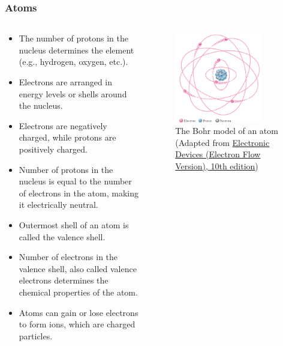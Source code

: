 \begin{frame}
	\frametitle{Atoms}
	\begin{columns}
		\begin{column}{0.65\textwidth}
          \begin{itemize}
            \item The number of protons in the nucleus determines the element (e.g., hydrogen, oxygen, etc.).
            \item Electrons are arranged in energy levels or shells around the nucleus.
            \item Electrons are negatively charged, while protons are positively charged.
            \item Number of protons in the nucleus is equal to the number of electrons in the atom, making it electrically neutral.
            \item Outermost shell of an atom is called the valence shell.
            \item Number of electrons in the valence shell, also called valence electrons determines the chemical properties of the atom.
            \item Atoms can gain or lose electrons to form ions, which are charged particles.
          \end{itemize}
		\end{column}
        \hfill
		\begin{column}{0.35\textwidth}
            \begin{figure}
                \centering
                \includegraphics[width=0.8\textwidth]{fig/lec02/Atom_model.png}
                \caption{The Bohr model of an atom (Adapted from \href{https://www.pearson.com/en-us/subject-catalog/p/electronic-devices-electron-flow-version/P200000001048/9780137556755}{Electronic Devices (Electron Flow Version), 10th edition})}
            \end{figure}
		\end{column}
		\end{columns}
\end{frame}

